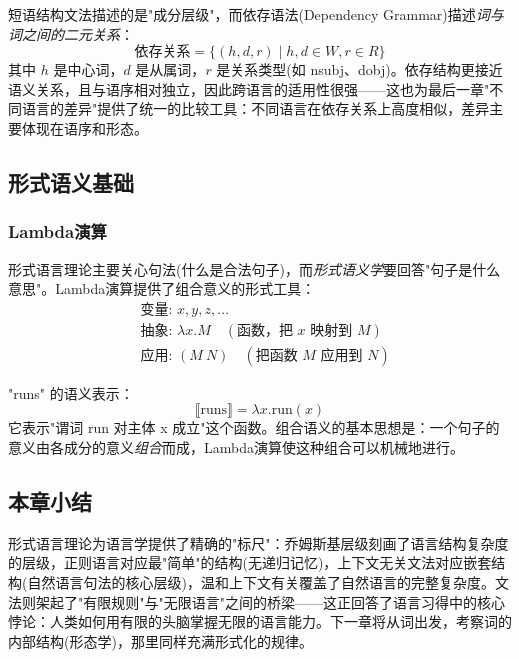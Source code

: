 短语结构文法描述的是"成分层级"，而依存语法(Dependency Grammar)描述\emph{词与词之间的二元关系}：
\begin{equation}
    \text{依存关系} = \{(h, d, r) \mid h, d \in W, r \in R\}
\end{equation}
其中 $h$ 是中心词，$d$ 是从属词，$r$ 是关系类型(如 nsubj、dobj)。依存结构更接近语义关系，且与语序相对独立，因此跨语言的适用性很强——这也为最后一章"不同语言的差异"提供了统一的比较工具：不同语言在依存关系上高度相似，差异主要体现在语序和形态。

\subsection{形式语义基础}

\subsubsection{Lambda演算}

形式语言理论主要关心句法(什么是合法句子)，而\emph{形式语义学}要回答"句子是什么意思"。Lambda演算提供了组合意义的形式工具：
\begin{equation}
    \begin{aligned}
    &\text{变量: } x, y, z, \ldots \\
    &\text{抽象: } \lambda x.M \quad (\text{函数，把 } x \text{ 映射到 } M) \\
    &\text{应用: } (M \ N) \quad (\text{把函数 } M \text{ 应用到 } N)
    \end{aligned}
\end{equation}

\begin{example}
"runs" 的语义表示：
\begin{equation}
    \llbracket \text{runs} \rrbracket = \lambda x.\text{run}(x)
\end{equation}
它表示"谓词 run 对主体 x 成立"这个函数。组合语义的基本思想是：一个句子的意义由各成分的意义\emph{组合}而成，Lambda演算使这种组合可以机械地进行。
\end{example}

\subsection{本章小结}

形式语言理论为语言学提供了精确的"标尺"：乔姆斯基层级刻画了语言结构复杂度的层级，正则语言对应最"简单"的结构(无递归记忆)，上下文无关文法对应嵌套结构(自然语言句法的核心层级)，温和上下文有关覆盖了自然语言的完整复杂度。文法则架起了"有限规则"与"无限语言"之间的桥梁——这正回答了语言习得中的核心悖论：人类如何用有限的头脑掌握无限的语言能力。下一章将从词出发，考察词的内部结构(形态学)，那里同样充满形式化的规律。
